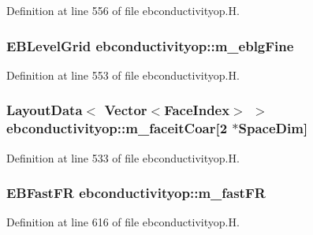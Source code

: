Definition at line 556 of file ebconductivityop.\+H.

\subsubsection[{\texorpdfstring{m\+\_\+eblg\+Fine}{m_eblgFine}}]{\setlength{\rightskip}{0pt plus 5cm}E\+B\+Level\+Grid ebconductivityop\+::m\+\_\+eblg\+Fine\hspace{0.3cm}{\ttfamily [protected]}}\hypertarget{classebconductivityop_ac8fb94db539cc265a5851d3178979484}{}\label{classebconductivityop_ac8fb94db539cc265a5851d3178979484}


Definition at line 553 of file ebconductivityop.\+H.

\subsubsection[{\texorpdfstring{m\+\_\+faceit\+Coar}{m_faceitCoar}}]{\setlength{\rightskip}{0pt plus 5cm}Layout\+Data$<$ Vector$<$Face\+Index$>$ $>$ ebconductivityop\+::m\+\_\+faceit\+Coar\mbox{[}2 $\ast$Space\+Dim\mbox{]}\hspace{0.3cm}{\ttfamily [protected]}}\hypertarget{classebconductivityop_a9a2babb720c5443c5b69a0b3c5da7f49}{}\label{classebconductivityop_a9a2babb720c5443c5b69a0b3c5da7f49}


Definition at line 533 of file ebconductivityop.\+H.

\subsubsection[{\texorpdfstring{m\+\_\+fast\+FR}{m_fastFR}}]{\setlength{\rightskip}{0pt plus 5cm}E\+B\+Fast\+FR ebconductivityop\+::m\+\_\+fast\+FR\hspace{0.3cm}{\ttfamily [protected]}}\hypertarget{classebconductivityop_a3ebb18273aedcb3b8d411defa0bc61d6}{}\label{classebconductivityop_a3ebb18273aedcb3b8d411defa0bc61d6}


Definition at line 616 of file ebconductivityop.\+H.

